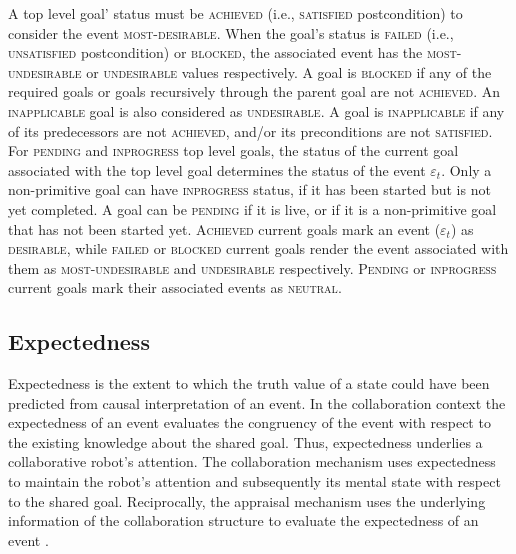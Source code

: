 \documentclass[12pt]{report}
\begin{document}

A top level goal' status must be \textsc{achieved} (i.e., \textsc{satisfied}
postcondition) to consider the event \textsc{most-desirable}. When the goal's
status is \textsc{failed} (i.e., \textsc{unsatisfied} postcondition) or
\textsc{blocked}, the associated event has the \textsc{most-undesirable} or
\textsc{undesirable} values respectively. A goal is \textsc{blocked} if any of
the required goals or goals recursively through the parent goal are not
\textsc{achieved}. An \textsc{inapplicable} goal is also considered as
\textsc{undesirable}. A goal is \textsc{inapplicable} if any of its predecessors
are not \textsc{achieved}, and/or its preconditions are not \textsc{satisfied}.
For \textsc{pending} and \textsc{inprogress} top level goals, the status of the
current goal associated with the top level goal determines the status of the
event $\varepsilon_t$. Only a non-primitive goal can have \textsc{inprogress}
status, if it has been started but is not yet completed. A goal can be
\textsc{pending} if it is live, or if it is a non-primitive goal that has not
been started yet. \textsc{Achieved} current goals mark an event
($\varepsilon_t$) as \textsc{desirable}, while \textsc{failed} or
\textsc{blocked} current goals render the event associated with them as
\textsc{most-undesirable} and \textsc{undesirable} respectively.
\textsc{Pending} or \textsc{inprogress} current goals mark their associated
events as \textsc{neutral}.

\subsection{Expectedness}
Expectedness is the extent to which the truth value of a state could have been
predicted from causal interpretation of an event. In the collaboration context
the expectedness of an event evaluates the congruency of the event with respect
to the existing knowledge about the shared goal. Thus, expectedness underlies a
collaborative robot's attention. The collaboration mechanism uses expectedness
to maintain the robot's attention and subsequently its mental state with respect
to the shared goal. Reciprocally, the appraisal mechanism uses the underlying
information of the collaboration structure to evaluate the expectedness of an
event \cite{shayganfar:appraisal-short}.
\end{document}
